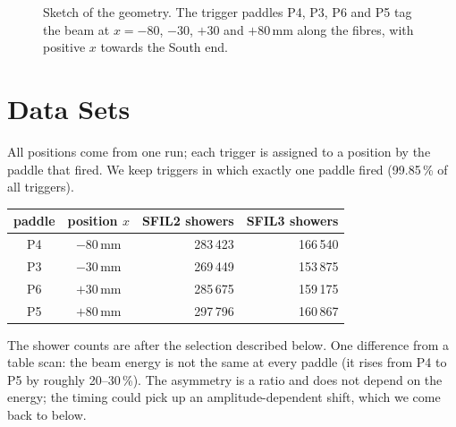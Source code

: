 \documentclass[11pt]{article}
\begin{document}
\begin{figure}[H]
\centering
{}
\caption{Sketch of the geometry. The trigger paddles P4, P3, P6 and P5 tag the beam at $x=-80$, $-30$, $+30$ and
$+80$\,mm along the fibres, with positive $x$ towards the South end.}
\label{fig:setup}
\end{figure}

\section*{Data Sets}

All positions come from one run; each trigger is assigned to a position by the paddle that fired. We keep triggers
in which exactly one paddle fired (99.85\,\% of all triggers).

\begin{center}
\begin{tabular}{ccrr}
\toprule
paddle & position $x$ & SFIL2 showers & SFIL3 showers \\
\midrule
P4 & $-80$\,mm & 283\,423 & 166\,540 \\
P3 & $-30$\,mm & 269\,449 & 153\,875 \\
P6 & $+30$\,mm & 285\,675 & 159\,175 \\
P5 & $+80$\,mm & 297\,796 & 160\,867 \\
\bottomrule
\end{tabular}
\end{center}

The shower counts are after the selection described below. One difference from a table scan: the beam energy is
not the same at every paddle (it rises from P4 to P5 by roughly 20--30\,\%). The asymmetry is a ratio and does
not depend on the energy; the timing could pick up an amplitude-dependent shift, which we come back to below.
\end{document}

